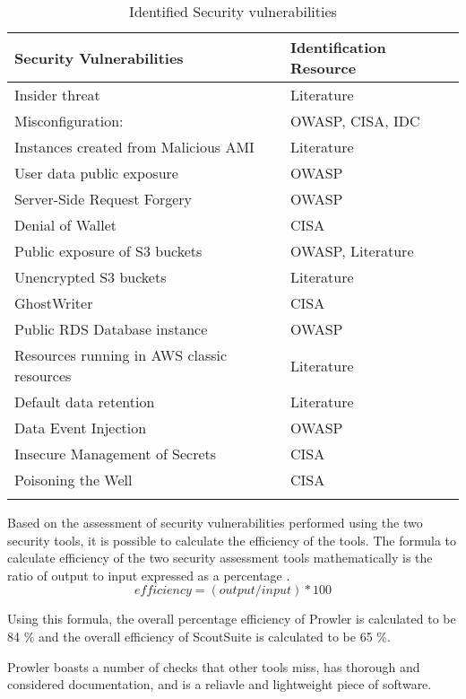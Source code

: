 \begin{longtable}{|p{9cm}|p{4.2cm}|}
    \hline
    \textbf{Security Vulnerabilities} & \textbf{Identification Resource}\\
    \hline
    Insider threat & Literature \cite{91} \\
    \hline
    Misconfiguration: & OWASP, CISA, IDC  \\
    \hline
    Instances created from Malicious AMI & Literature \cite{48} \\
    \hline
    User data public exposure & OWASP \\
    \hline
    Server-Side Request Forgery & OWASP \\
    \hline
    Denial of Wallet & CISA \\
    \hline
    Public exposure of S3 buckets & OWASP, Literature \cite{92}\\
    \hline
    Unencrypted S3 buckets & Literature \cite{93}\\
    \hline
    GhostWriter & CISA \\
    \hline
    Public RDS Database instance & OWASP\\
    \hline
    Resources running in AWS classic resources & Literature \cite{94}\\
    \hline
    Default data retention & Literature \cite{95} \\
    \hline
    Data Event Injection & OWASP \\
    \hline
    Insecure Management of Secrets & CISA\\
    \hline
    Poisoning the Well & CISA \\
    \hline
    \caption{Identified Security vulnerabilities}
    \label{tab:securityvulnerabilitiesandresources}
\end{longtable}

\par Based on the assessment of security vulnerabilities performed using the two security tools, it is possible to calculate the efficiency of the tools.
The formula to calculate efficiency of the two security assessment tools mathematically is the ratio of output to input expressed as a percentage \cite{88}.
\[ efficiency = (output/input) * 100 \]

Using this formula, the overall percentage efficiency of Prowler is calculated to be 84 \% and the overall efficiency of ScoutSuite is calculated to be 65 \%.

\par Prowler boasts a number of checks that other tools miss, has thorough and considered documentation, and is a reliavle and lightweight piece of software.

